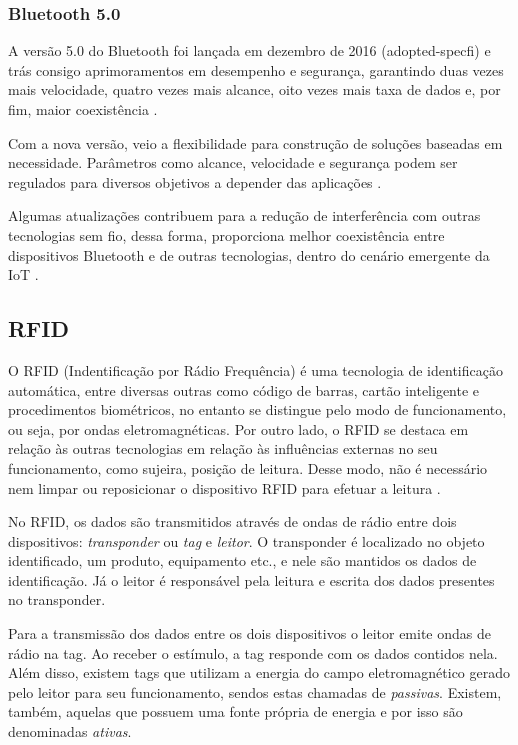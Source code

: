\subsubsection{Bluetooth 5.0}

A versão 5.0 do Bluetooth foi lançada em dezembro de 2016 (adopted-specfi) e trás consigo 
aprimoramentos em desempenho e segurança, garantindo duas vezes mais velocidade, quatro vezes mais 
alcance, oito vezes mais taxa de dados e, por fim, maior coexistência \cite{bluetoothsig2016}. 

Com a nova versão, veio a flexibilidade para construção de soluções baseadas em necessidade. 
Parâmetros como alcance, velocidade e segurança podem ser regulados para diversos objetivos a 
depender das aplicações \cite{bluetoothsig2016}.

Algumas atualizações contribuem para a redução de interferência com outras tecnologias sem fio, 
dessa forma, proporciona melhor coexistência entre dispositivos Bluetooth e de outras tecnologias, 
dentro do cenário emergente da IoT \cite{bluetoothsig2016}.






\subsection{RFID}

O RFID (Indentificação por Rádio Frequência) é uma tecnologia de identificação automática, entre 
diversas outras como código de barras, cartão inteligente e procedimentos biométricos, no entanto 
se distingue pelo modo de funcionamento, ou seja, por ondas eletromagnéticas. 
Por outro lado, o RFID se destaca em relação às outras tecnologias em relação às 
influências externas no seu funcionamento, como sujeira, posição de leitura. Desse modo, não é 
necessário nem limpar ou reposicionar o dispositivo RFID para efetuar a leitura \cite{klaus2011}. 

No RFID, os dados são transmitidos através de ondas de rádio entre dois dispositivos: 
\textit{transponder} ou \textit{tag} e \textit{leitor}. O transponder é localizado no objeto 
identificado, um 
produto, equipamento etc., e nele são mantidos os dados de identificação. Já o leitor é responsável 
pela leitura e escrita dos dados presentes no transponder.

Para a transmissão dos dados entre os dois dispositivos o leitor emite ondas de rádio na tag. Ao 
receber o estímulo, a tag responde com os dados contidos nela. Além disso, existem tags que 
utilizam a energia do campo eletromagnético gerado pelo leitor para seu funcionamento, sendos estas 
chamadas de \textit{passivas}. Existem, também, aquelas que possuem uma fonte própria de energia e 
por isso são denominadas \textit{ativas}.

